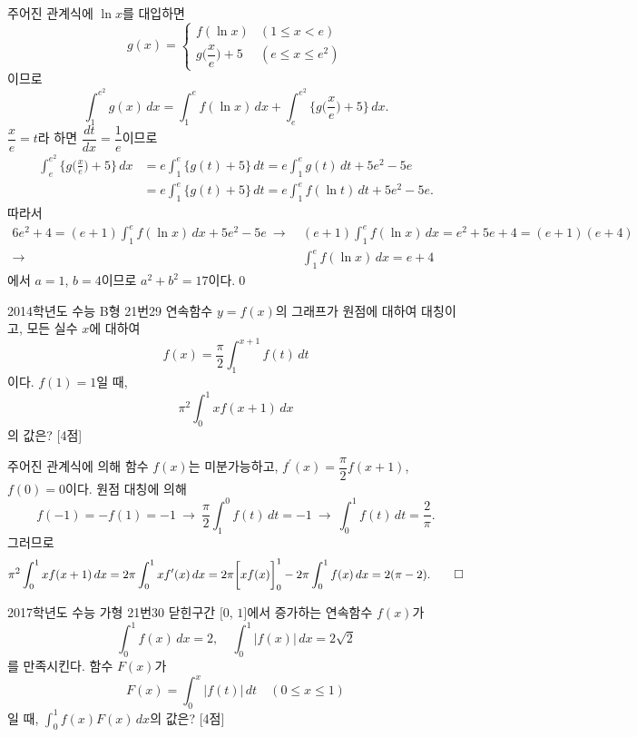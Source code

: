 \documentclass{article}
\begin{document}
\begin{sol}
	주어진 관계식에 $\ln x$를 대입하면
	\[
		g(x)=\begin{cases}
			f(\ln x) & (1\leq x<e)\\[3pt]
			g\biggl(\dfrac{x}{e}\biggr)+5 & (e\leq x\leq e^2)
		\end{cases}
	\]
	이므로
	\[
		\int_1^{e^2}g(x)\,dx=\int_1^ef(\ln x)\,dx+\int_e^{e^2}\biggl\{g\biggl(\frac{x}{e}\biggr)+5\biggr\}\,dx.
	\]
	$\dfrac{x}{e}=t$라 하면 $\dfrac{dt}{dx}=\dfrac{1}{e}$이므로
	\begin{align*}
		\int_e^{e^2}\biggl\{g\biggl(\frac{x}{e}\biggr)+5\biggr\}\,dx&=e\int_1^e\{g(t)+5\}\,dt=e\int_1^eg(t)\,dt+5e^2-5e\\[3pt]
		&=e\int_1^e\{g(t)+5\}\,dt=e\int_1^ef(\ln t)\,dt+5e^2-5e.
	\end{align*}
	따라서
	\begin{align*}
		6e^2+4=(e+1)\int_1^ef(\ln x)\,dx+5e^2-5e~\longrightarrow~&(e+1)\int_1^ef(\ln x)\,dx=e^2+5e+4=(e+1)(e+4)\\[3pt]
		\longrightarrow~&\int_1^ef(\ln x)\,dx=e+4
	\end{align*}
	에서 $a=1$, $b=4$이므로 $a^2+b^2=17$이다.\qed
\end{sol}

\newpage
\begin{prob}{2014학년도 수능 B형 21번}{29}
	연속함수 $y=f(x)$의 그래프가 원점에 대하여 대칭이고, 모든 실수 $x$에 대하여
	\[
		f(x)=\frac{\pi}{2}\int_1^{x+1}f(t)\,dt
	\]
	이다. $f(1)=1$일 때,
	\[
		\pi^2\int_0^1xf(x+1)\,dx
	\]
	의 값은? [4점]
\end{prob}

\begin{sol}
	주어진 관계식에 의해 함수 $f(x)$는 미분가능하고, $f^{\prime}(x)=\dfrac{\pi}{2}f(x+1)$, $f(0)=0$이다. 원점 대칭에 의해
	\[
		f(-1)=-f(1)=-1~\longrightarrow~\frac{\pi}{2}\int_1^0f(t)\,dt=-1~\longrightarrow~\int_0^1f(t)\,dt=\frac{2}{\pi}.
	\]
	그러므로
	\[
		\pi^2\int_0^1xf(x+1)\,dx=2\pi\int_0^1xf^{\prime}(x)\,dx=2\pi\biggl[xf(x)\biggr]_0^1-2\pi\int_0^1f(x)\,dx=2(\pi-2).\qed
	\]
\end{sol}

\newpage
\begin{prob}{2017학년도 수능 가형 21번}{30}
	닫힌구간 $[0$, $1]$에서 증가하는 연속함수 $f(x)$가
	\[
		\int_0^1f(x)\,dx=2,\quad\int_0^1\vert f(x)\vert\,dx=2\sqrt 2
	\]
	를 만족시킨다. 함수 $F(x)$가
	\[
		F(x)=\int_0^x\vert f(t)\vert\,dt\quad (0\leq x\leq 1)
	\]
	일 때, $\displaystyle\int_0^1f(x)F(x)\,dx$의 값은? [4점]
\end{prob}
\end{document}
